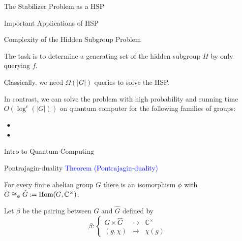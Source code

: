 \documentclass[slideColor]{prosper}
\newcommand{\C}{{\mathbb{C}}}
\renewcommand{\>}{\rangle}
\newcommand{\<}{\langle}
\begin{document}

\begin{slide}{The Stabilizer Problem as a HSP}

\end{slide}


\begin{slide}{Important Applications of HSP}

\end{slide}


\begin{slide}{Complexity of the Hidden Subgroup Problem}

The task is to determine a generating set of the hidden subgroup $H$ by only querying $f$.

\bigskip
Classically, we need $\Omega(|G|)$ queries to solve the HSP.  

\bigskip
In contrast, we can solve the problem with high probability and running time $O(\log^c(|G|))$ on quantum computer for the following families of groups:

\begin{itemize}
\item
\item
\end{itemize}
\end{slide}


\begin{slide}{Intro to Quantum Computing}

\end{slide}


\begin{slide}{Pontrajagin-duality}
\textcolor{blue}{Theorem (Pontrajagin-duality)}

For every finite abelian group $G$ there is an isomorphism $\phi$ with $G\cong_{\phi} \hat{G}:={\rm Hom}(G,\C^\times)$.

\medskip
Let $\beta$ be the pairing between $G$ and $\hat{G}$ defined by 
\[
\beta : \left\{
\begin{array}{ccc}
G \times \hat{G} & \rightarrow & \C^\times \\
(g,\chi)         & \mapsto     & \chi(g)
\end{array}
\right.
\]

\end{slide}
\end{document}
